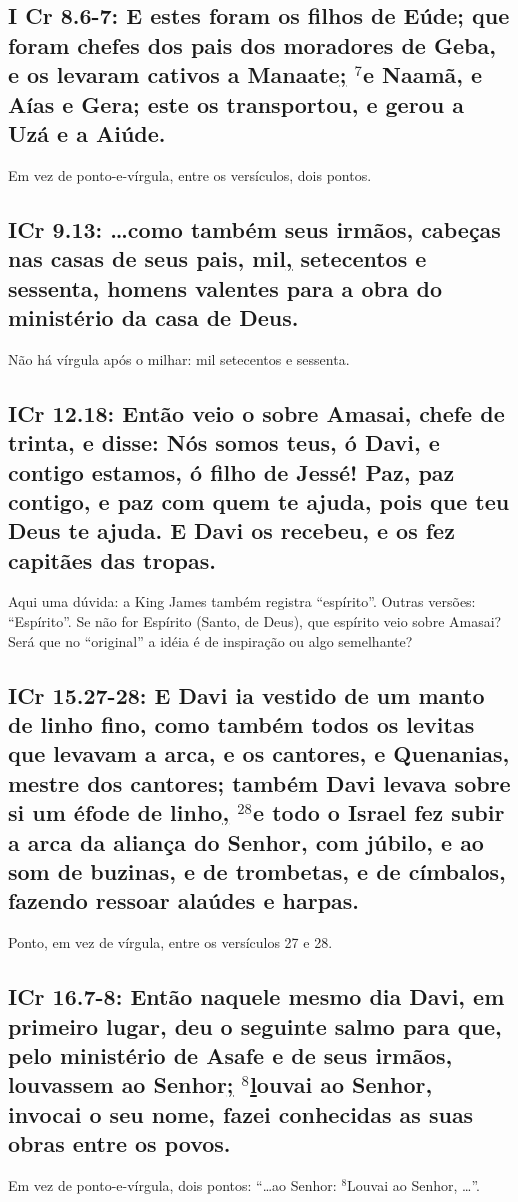 \subsection{I Cr 8.6-7: E estes foram os filhos de Eúde; que foram chefes dos pais dos moradores de Geba, e os levaram cativos a Manaate\uline{;} $^{\mathrm{7}}$e Naamã, e Aías e Gera; este os transportou, e gerou a Uzá e a Aiúde.}
Em vez de ponto-e-vírgula, entre os versículos, dois pontos.

\subsection{ICr 9.13: \ldots como também seus irmãos, cabeças nas casas de seus pais, mil\uline{,} setecentos e sessenta, homens valentes para a obra do ministério da casa de Deus.}

Não há vírgula após o milhar: mil setecentos e sessenta.

\subsection{ICr 12.18: Então veio o  sobre Amasai, chefe de trinta, e disse: Nós somos teus, ó Davi, e contigo estamos, ó filho de Jessé! Paz, paz contigo, e paz com quem te ajuda, pois que teu Deus te ajuda. E Davi os recebeu, e os fez capitães das tropas.}

Aqui uma dúvida: a King James também registra ``espírito''. Outras
versões: ``Espírito''. Se não for Espírito (Santo, de Deus), que
espírito veio sobre Amasai? Será que no ``original'' a idéia é de
inspiração ou algo semelhante?

\subsection{ICr 15.27-28: E Davi ia vestido de um manto de linho fino, como também todos os levitas que levavam a arca, e os cantores, e Quenanias, mestre dos cantores; também Davi levava sobre si um éfode de linho\uline{,} $^{\mathrm{28}}$e todo o Israel fez subir a arca da aliança do Senhor, com júbilo, e ao som de buzinas, e de trombetas, e de címbalos, fazendo ressoar alaúdes e harpas.}
Ponto, em vez de vírgula, entre os versículos 27 e 28.

\subsection{ICr 16.7-8: Então naquele mesmo dia Davi, em primeiro lugar, deu o seguinte salmo para que, pelo ministério de Asafe e de seus irmãos, louvassem ao Senhor\uline{;} $^{\mathrm{8}}$\uline{l}ouvai ao Senhor, invocai o seu nome, fazei conhecidas as suas obras entre os povos.}
Em vez de ponto-e-vírgula, dois pontos: ``\ldots ao Senhor:
$^{\mathrm{8}}$Louvai ao Senhor, \ldots''.


